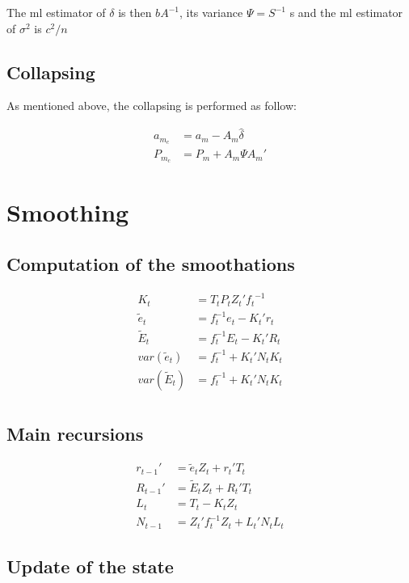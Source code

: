\documentclass[
  letterpaper,
  DIV=11,
  numbers=noendperiod]{scrreprt}
\begin{document}
The ml estimator of \(\delta\) is then \(bA^{-1}\), its variance
\(\Psi= S^{-1}\) s and the ml estimator of \(\sigma^2\) is \(c^2/n\)

\subsection{Collapsing}\label{collapsing}

As mentioned above, the collapsing is performed as follow:

\[ 
\begin{align*}
a_{m_c} &= a_m - A_m \hat{\delta} \\
P_{m_c} &= P_m + A_m \Psi A_m'
\end{align*}
\]

\section{Smoothing}\label{smoothing}

\subsection{Computation of the
smoothations}\label{computation-of-the-smoothations}

\[ 
\begin{align*}
K_t &= T_t P_t Z_t' {f_t}^{-1} \\
\tilde e_t &=  f_t^{-1}e_t - K_t'r_t \\
\tilde E_t &=  f_t^{-1}E_t - K_t'R_t \\
var(\tilde e_t) &= f_t^{-1} + K_t' N_t K_t \\
var(\tilde E_t) &= f_t^{-1} + K_t' N_t K_t \\
\end{align*}
\]

\subsection{Main recursions}\label{main-recursions}

\[ 
\begin{align*}
r_{t-1}' &= \tilde e_t Z_t + r_t' T_t \\
R_{t-1}' &= \tilde E_t Z_t + R_t' T_t \\
L_t &= T_t - K_t Z_t \\
N_{t-1} &= Z_t' f_t^{-1} Z_t + L_t' N_t L_t 
\end{align*}
\]

\subsection{Update of the state}\label{update-of-the-state}
\end{document}
